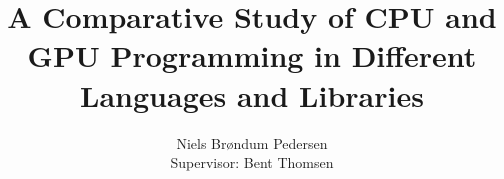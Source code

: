\documentclass{llncs}
\begin{document}

\newpage

\title{A Comparative Study of CPU and GPU Programming in Different Languages and Libraries}

\author{Niels Br\o ndum Pedersen\\ Supervisor: Bent Thomsen}
\newpage









\end{document}
